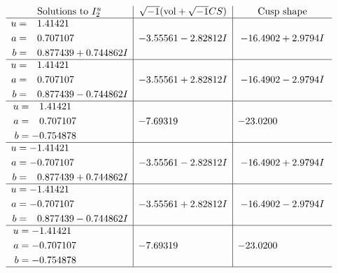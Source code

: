 \documentclass[1p]{elsarticle_modified}
\theoremstyle{definition}
\newcommand{\I}{\sqrt{-1}}
\begin{document}
$$\begin{array}{c|c|c}  
\text{Solutions to }I^u_{2}& \I (\text{vol} + \sqrt{-1}CS) & \text{Cusp shape}\\
 \hline 
\begin{aligned}
u &= \phantom{-}1.41421\phantom{ +0.000000I} \\
a &= \phantom{-}0.707107\phantom{ +0.000000I} \\
b &= \phantom{-}0.877439 + 0.744862 I\end{aligned}
 & -3.55561 - 2.82812 I & -16.4902 + 2.9794 I \\ \hline\begin{aligned}
u &= \phantom{-}1.41421\phantom{ +0.000000I} \\
a &= \phantom{-}0.707107\phantom{ +0.000000I} \\
b &= \phantom{-}0.877439 - 0.744862 I\end{aligned}
 & -3.55561 + 2.82812 I & -16.4902 - 2.9794 I \\ \hline\begin{aligned}
u &= \phantom{-}1.41421\phantom{ +0.000000I} \\
a &= \phantom{-}0.707107\phantom{ +0.000000I} \\
b &= -0.754878\phantom{ +0.000000I}\end{aligned}
 & -7.69319\phantom{ +0.000000I} & -23.0200\phantom{ +0.000000I} \\ \hline\begin{aligned}
u &= -1.41421\phantom{ +0.000000I} \\
a &= -0.707107\phantom{ +0.000000I} \\
b &= \phantom{-}0.877439 + 0.744862 I\end{aligned}
 & -3.55561 - 2.82812 I & -16.4902 + 2.9794 I \\ \hline\begin{aligned}
u &= -1.41421\phantom{ +0.000000I} \\
a &= -0.707107\phantom{ +0.000000I} \\
b &= \phantom{-}0.877439 - 0.744862 I\end{aligned}
 & -3.55561 + 2.82812 I & -16.4902 - 2.9794 I \\ \hline\begin{aligned}
u &= -1.41421\phantom{ +0.000000I} \\
a &= -0.707107\phantom{ +0.000000I} \\
b &= -0.754878\phantom{ +0.000000I}\end{aligned}
 & -7.69319\phantom{ +0.000000I} & -23.0200\phantom{ +0.000000I}\\
 \hline 
 \end{array}$$\newpage\newpage\renewcommand{\arraystretch}{1}
\end{document}
